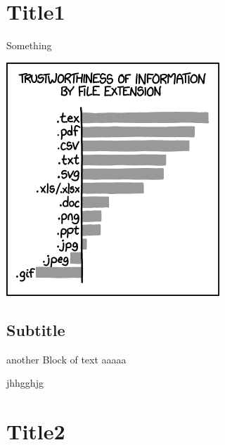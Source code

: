 
\section{Title1}
Something

\includegraphics{image.png}
\subsection{Subtitle}
another Block of text
aaaaa

jhhgghjg

\section{Title2}
